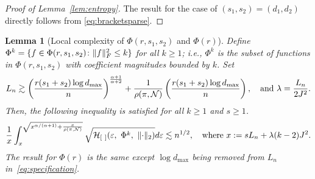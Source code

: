 \documentclass[11pt]{article}
\theoremstyle{plain}
\newtheorem{lem}{Lemma}
\theoremstyle{definition}
\begin{document}
\begin{proof}[Proof of Lemma~\ref{lem:entropy}]
The result for the case of $(s_1,s_2) = (d_1,d_2)$ directly follows from \eqref{eq:bracketsparse}.
\end{proof}





\begin{lem}[Local complexity of $\Phi(r,s_1,s_2)$ and $\Phi(r)$] \label{lem:metric}
Define $\Phi^{k}=\{f\in\Phi(r,s_1,s_2)\colon \lVert f\rVert_F^2 \leq k\}$ for all $k\geq 1$; i.e., $\Phi^k$ is the subset of functions in $\Phi(r,s_1,s_2)$ with coefficient magnitudes bounded by $k$. Set 
\begin{equation}\label{eq:specification}
L_n\gtrsim \left({r(s_1+s_2)\log d_{\max} \over n } \right)^{\alpha+1\over \alpha+2} + {1\over \rho (\pi, \tN)}\left({r(s_1+s_2)\log d_{\max} \over n } \right),\quad \text{and}\ 
\lambda={L_n\over 2 J^2}.
\end{equation}
Then, the following inequality is satisfied for all $k\geq 1$ and $s\geq 1$.
\begin{equation}
{1\over x}\int^{\sqrt{x^{\alpha/(\alpha+1)}+{x\over \rho (\pi, \mathcal{N})}}}_{x} \sqrt{\mathcal{H}_{[\ ]}(\varepsilon,\ \Phi^{k},\ \lVert\cdot\rVert_2) }d\varepsilon \lesssim n^{1/2}, \quad \text{where}\ x:=sL_n+\lambda (k-2)J^2.
\end{equation}
The result for $\Phi(r)$ is the same  except $\log d_{\max}$ being removed from $L_n$ in~\eqref{eq:specification}.
\end{lem}
\end{document}
